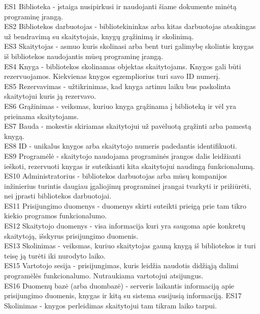\documentclass{VUMIFPSkursinis}
\begin{document}
\noindent
ES1 Biblioteka - įstaiga nusipirkusi ir naudojanti šiame dokumente minėtą programinę įrangą.\\
ES2 Bibliotekos darbuotojas - bibliotekininkas arba kitas darbuotojas atsakingas už bendravimą su skaitytojais, knygų grąžinimą ir skolinimą.\\
ES3 Skaitytojas - asmuo kuris skolinasi arba bent turi galimybę skolintis knygas iš bibliotekos naudojantis mūsų programinę įrangą.\\
ES4 Knyga - bibliotekos skolinamas objektas skaitytojams. Knygos gali būti rezervuojamos. Kiekvienas knygos egzempliorius turi savo ID numerį.\\
ES5 Rezervavimas - užtikrinimas, kad knyga artimu laiku bus paskolinta skaitytojui kuris ją rezervavo.\\
ES6 Grąžinimas - veiksmas, kuriuo knyga grąžinama į biblioteką ir vėl yra prieinama skaitytojams.\\
ES7 Bauda - mokestis skiriamas skaitytojui už pavėluotą grąžinti arba pamestą knygą.\\
ES8 ID - unikalus knygos arba skaitytojo numeris padedantis identifikuoti.\\
ES9 Programėlė - skaitytojo naudojama programinės įrangos dalis leidžianti ieškoti, rezervuoti knygas ir suteikianti kita skaitytojui naudingą funkcionalumą.\\
ES10 Administratorius - bibliotekos darbuotojas arba mūsų kompanijos inžinierius turintis daugiau įgaliojimų programinei įrangai tvarkyti ir prižiūrėti, nei įprasti bibliotekos darbuotojai.\\
ES11 Prisijungimo duomenys - duomenys skirti suteikti prieigą prie tam tikro kiekio programos funkcionalumo.\\
ES12 Skaitytojo duomenys - visa informacija kuri yra saugoma apie konkretų skaitytoją, išskyrus prisijungimo duomenis.\\
ES13 Skolinimas - veiksmas, kuriuo skaitytojas gauną knygą iš bibliotekos ir turi teisę ją turėti iki nurodyto laiko.\\
ES15 Vartotojo sesija - prisijungimas, kuris leidžia naudotis didžiąją dalimi programėlės funkcionalumo. Nutraukiama vartotojui atsijungus.\\
ES16 Duomenų bazė (arba duombazė) - serveris laikantis informaciją apie prisijungimo duomenis, knygas ir kitą su sistema susijusią informaciją.
ES17 Skolinimas - knygos perleidimas skaitytojui tam tikram laiko tarpui.
\newpage
\end{document}
